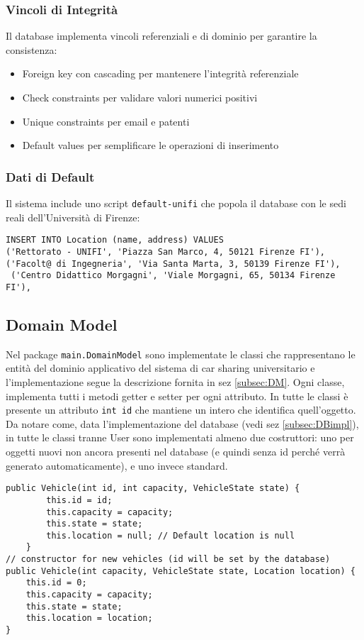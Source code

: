 \subsubsection{Vincoli di Integrità}
Il database implementa vincoli referenziali e di dominio per garantire la consistenza:
\begin{itemize}
\item Foreign key con cascading per mantenere l'integrità referenziale
\item Check constraints per validare valori numerici positivi
\item Unique constraints per email e patenti
\item Default values per semplificare le operazioni di inserimento
\end{itemize}
\subsubsection{Dati di Default}
Il sistema include uno script \texttt{default-unifi} che popola il database con le sedi reali dell'Università di Firenze:
\begin{lstlisting}[style=sql, caption={Esempio inserimento dati di default per le location}]
INSERT INTO Location (name, address) VALUES
('Rettorato - UNIFI', 'Piazza San Marco, 4, 50121 Firenze FI'),
('Facolt@ di Ingegneria', 'Via Santa Marta, 3, 50139 Firenze FI'),
 ('Centro Didattico Morgagni', 'Viale Morgagni, 65, 50134 Firenze FI'),
\end{lstlisting}

\subsection{Domain Model}
Nel package \texttt{main.DomainModel} sono implementate le classi che rappresentano le entità del dominio applicativo del sistema di car sharing universitario e  l'implementazione segue la descrizione fornita in sez \ref{subsec:DM}. Ogni classe, implementa tutti i metodi getter e setter per ogni attributo.
In tutte le classi è presente un attributo \texttt{int id} che mantiene un intero che identifica quell'oggetto.\\
Da notare come, data l'implementazione del database (vedi sez \ref{subsec:DBimpl}), in tutte le classi tranne User sono implementati almeno due costruttori: uno per oggetti nuovi non ancora presenti nel database (e quindi senza id perché verrà generato automaticamente), e uno invece standard.
\begin{lstlisting}[style=java, caption={Esempio di costruttori della classe Vehicle}]
public Vehicle(int id, int capacity, VehicleState state) {
        this.id = id;
        this.capacity = capacity;
        this.state = state;
        this.location = null; // Default location is null
    }
// constructor for new vehicles (id will be set by the database)
public Vehicle(int capacity, VehicleState state, Location location) {
    this.id = 0;
    this.capacity = capacity;
    this.state = state;
    this.location = location;
}
\end{lstlisting}
